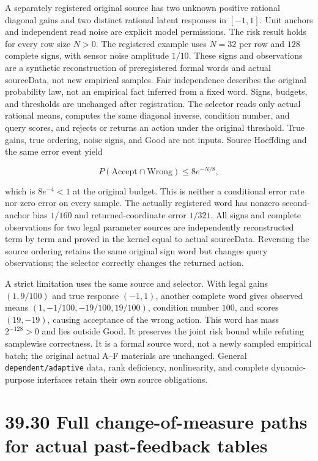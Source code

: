 \documentclass[
  english,
  11pt,
  oneside]{book}
\begin{document}
A separately registered original source has two unknown positive rational diagonal gains and two distinct rational latent responses in \([-1,1]\). Unit anchors and independent read noise are explicit model permissions. The risk result holds for every row size \(N>0\). The registered example uses \(N=32\) per row and \(128\) complete signs, with sensor noise amplitude \(1/10\). These signs and observations are a synthetic reconstruction of preregistered formal words and actual sourceData, not new empirical samples. Fair independence describes the original probability law, not an empirical fact inferred from a fixed word. Signs, budgets, and thresholds are unchanged after registration. The selector reads only actual rational means, computes the same diagonal inverse, condition number, and query scores, and rejects or returns an action under the original threshold. True gains, true ordering, noise signs, and Good are not inputs. Source Hoeffding and the same error event yield

\[P(\mathrm{Accept}\cap\mathrm{Wrong})\le 8e^{-N/8},\]

which is \(8e^{-4}<1\) at the original budget. This is neither a conditional error rate nor zero error on every sample. The actually registered word has nonzero second-anchor bias \(1/160\) and returned-coordinate error \(1/321\). All signs and complete observations for two legal parameter sources are independently reconstructed term by term and proved in the kernel equal to actual sourceData. Reversing the source ordering retains the same original sign word but changes query observations; the selector correctly changes the returned action.

A strict limitation uses the same source and selector. With legal gains \((1,9/100)\) and true response \((-1,1)\), another complete word gives observed means \((1,-1/100,-19/100,19/100)\), condition number \(100\), and scores \((19,-19)\), causing acceptance of the wrong action. This word has mass \(2^{-128}>0\) and lies outside Good. It preserves the joint risk bound while refuting samplewise correctness. It is a formal source word, not a newly sampled empirical batch; the original actual A--F materials are unchanged. General \nolinkurl{dependent/adaptive} data, rank deficiency, nonlinearity, and complete dynamic-purpose interfaces retain their own source obligations.

\section{39.30 Full change-of-measure paths for actual past-feedback tables}\label{full-change-of-measure-paths-for-actual-past-feedback-tables}
\end{document}
